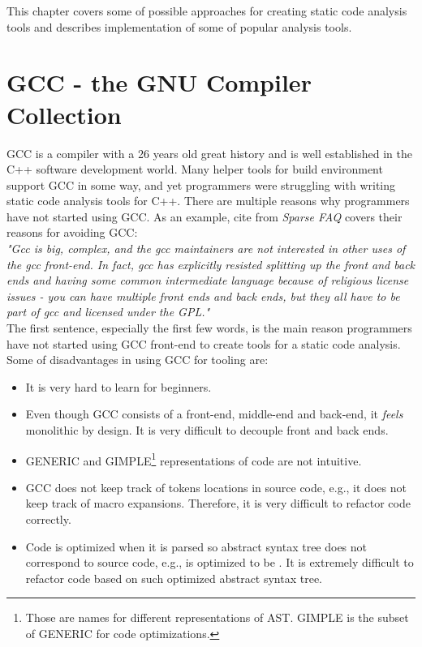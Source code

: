 This chapter covers some of possible approaches for creating static code analysis tools and describes implementation of some of popular analysis tools.

\section{GCC - the GNU Compiler Collection}
GCC is a compiler with a 26 years old great history and is well established in the C++ software development world. Many helper tools for build environment support GCC in some way, and yet programmers were struggling with writing static code analysis tools for C++. There are multiple reasons why programmers have not started using GCC. As an example, cite from \emph{Sparse FAQ} \cite{sparse} covers their reasons for avoiding GCC: \\

\textit{"Gcc is big, complex, and the gcc maintainers are not interested in other uses of the gcc front-end.  In fact, gcc has explicitly resisted splitting up the front and back ends and having some common intermediate language because of religious license issues - you can have multiple front ends and back ends, but they all have to be part of gcc and licensed under the GPL."}\\

The first sentence, especially the first few words, is the main reason programmers have not started using GCC front-end to create tools for a static code analysis. Some of disadvantages in using GCC for tooling are:

\begin{itemize}
\item It is very hard to learn for beginners.

\item Even though GCC consists of a front-end, middle-end and back-end, it \textit{feels} monolithic by design. It is very difficult to decouple front and back ends.

\item GENERIC and GIMPLE\footnote{Those are names for different representations of AST. GIMPLE is the subset of GENERIC for code optimizations.} representations of code are not intuitive.

\item GCC does not keep track of tokens locations in source code, e.g., it does not keep track of macro expansions. Therefore, it is very difficult to refactor code correctly.

\item Code is optimized when it is parsed so abstract syntax tree does not correspond to source code, e.g.,  is optimized to be . It is extremely difficult to refactor code based on such optimized abstract syntax tree.
\end{itemize}

